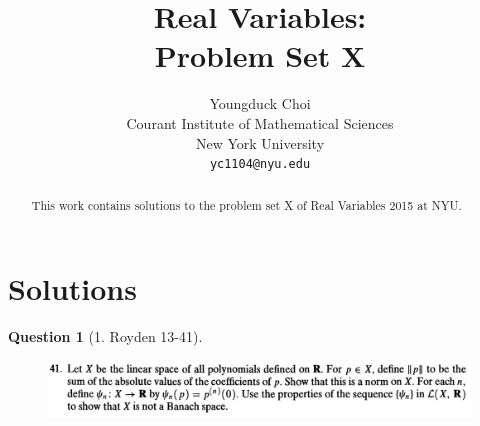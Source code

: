 \documentclass{article} %
\title{Real Variables: \\
Problem Set X}
\author{
Youngduck Choi \\
Courant Institute of Mathematical Sciences \\
New York University \\
\texttt{yc1104@nyu.edu} \\
}
\theoremstyle{quest}
\newtheorem*{question}{Question}
\begin{document}
\maketitle

\begin{abstract}
This work contains solutions to the problem set 
X of Real Variables 2015 at NYU.
\end{abstract}

\section{Solutions}

\begin{question}[1. Royden 13-41]
\hfill
\begin{figure}[h!]
  \centering
    \includegraphics[width=1\textwidth]{13-41.png}
\end{figure}
\end{question}
\end{document}
